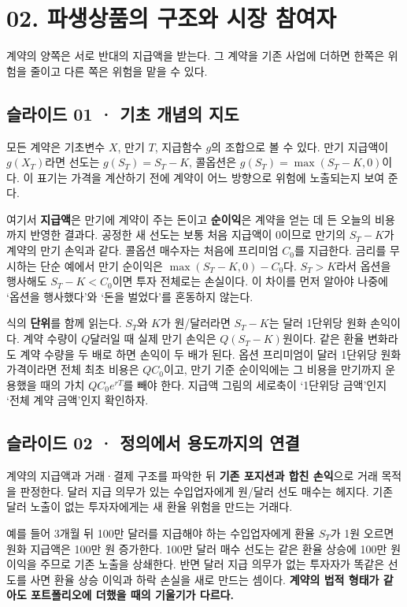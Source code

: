 \documentclass[11pt,a4paper]{article}
\begin{document}
\section{02. 파생상품의 구조와 시장 참여자}
계약의 양쪽은 서로 반대의 지급액을 받는다. 그 계약을 기존 사업에 더하면 한쪽은 위험을 줄이고 다른 쪽은 위험을 맡을 수 있다.\par

\subsection{슬라이드 01 · 기초 개념의 지도}
모든 계약은 기초변수 $X$, 만기 $T$, 지급함수 $g$의 조합으로 볼 수 있다. 만기 지급액이 $g(X_T)$라면 선도는 $g(S_T)=S_T-K$, 콜옵션은 $g(S_T)=\max(S_T-K,0)$이다. 이 표기는 가격을 계산하기 전에 계약이 어느 방향으로 위험에 노출되는지 보여 준다.\par

여기서 \textbf{지급액}은 만기에 계약이 주는 돈이고 \textbf{순이익}은 계약을 얻는 데 든 오늘의 비용까지 반영한 결과다. 공정한 새 선도는 보통 처음 지급액이 0이므로 만기의 $S_T-K$가 계약의 만기 손익과 같다. 콜옵션 매수자는 처음에 프리미엄 $C_0$를 지급한다. 금리를 무시하는 단순 예에서 만기 순이익은 $\max(S_T-K,0)-C_0$다. $S_T>K$라서 옵션을 행사해도 $S_T-K<C_0$이면 투자 전체로는 손실이다. 이 차이를 먼저 알아야 나중에 ‘옵션을 행사했다’와 ‘돈을 벌었다’를 혼동하지 않는다.\par

식의 \textbf{단위}를 함께 읽는다. $S_T$와 $K$가 원/달러라면 $S_T-K$는 달러 1단위당 원화 손익이다. 계약 수량이 $Q$달러일 때 실제 만기 손익은 $Q(S_T-K)$원이다. 같은 환율 변화라도 계약 수량을 두 배로 하면 손익이 두 배가 된다. 옵션 프리미엄이 달러 1단위당 원화 가격이라면 전체 최초 비용은 $QC_0$이고, 만기 기준 순이익에는 그 비용을 만기까지 운용했을 때의 가치 $QC_0e^{rT}$를 빼야 한다. 지급액 그림의 세로축이 ‘1단위당 금액’인지 ‘전체 계약 금액’인지 확인하자.\par

\subsection{슬라이드 02 · 정의에서 용도까지의 연결}
계약의 지급액과 거래·결제 구조를 파악한 뒤 \textbf{기존 포지션과 합친 손익}으로 거래 목적을 판정한다. 달러 지급 의무가 있는 수입업자에게 원/달러 선도 매수는 헤지다. 기존 달러 노출이 없는 투자자에게는 새 환율 위험을 만드는 거래다.\par

예를 들어 3개월 뒤 100만 달러를 지급해야 하는 수입업자에게 환율 $S_T$가 1원 오르면 원화 지급액은 100만 원 증가한다. 100만 달러 매수 선도는 같은 환율 상승에 100만 원 이익을 주므로 기존 노출을 상쇄한다. 반면 달러 지급 의무가 없는 투자자가 똑같은 선도를 사면 환율 상승 이익과 하락 손실을 새로 만드는 셈이다. \textbf{계약의 법적 형태가 같아도 포트폴리오에 더했을 때의 기울기가 다르다.}\par
\end{document}
